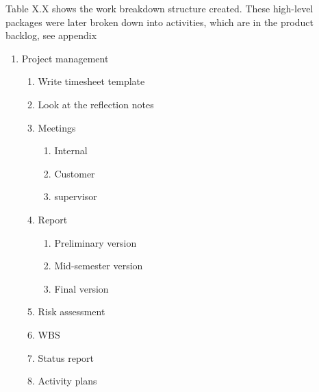 Table X.X shows the work breakdown structure created. These high-level
packages were later broken down into activities, which are in the
product backlog, see appendix 
\begin{framed}
    \begin{enumerate}
        \item Project management
        \begin{enumerate}
            \item Write timesheet template
            \item Look at the reflection notes
            \item Meetings
            \begin{enumerate}
                \item Internal
                \item Customer
                \item supervisor
            \end{enumerate}
            \item  Report
            \begin{enumerate}
                \item Preliminary version
                \item Mid-semester version
                \item Final version
            \end{enumerate}
            \item Risk assessment
            \item WBS
            \item Status report
            \item Activity plans
        \end{enumerate}


\end{enumerate}
\end{framed}
